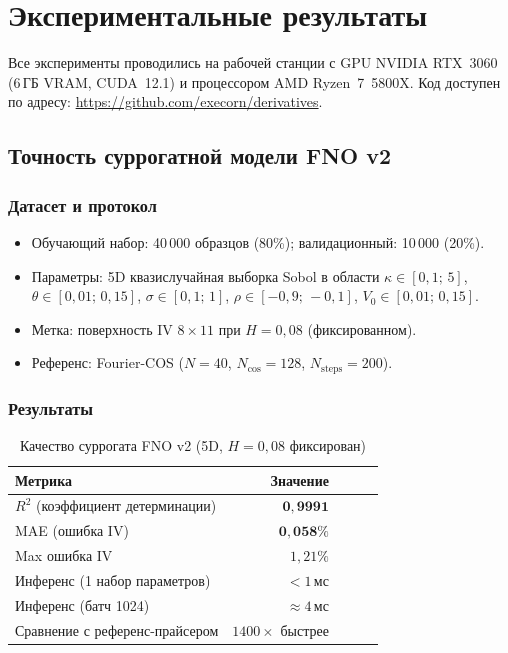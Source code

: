 
\section{Экспериментальные результаты}
\label{sec:experiments}

Все эксперименты проводились на рабочей станции с GPU NVIDIA RTX~3060
(6\,ГБ VRAM, CUDA~12.1) и процессором AMD Ryzen~7~5800X.
Код доступен по адресу: \url{https://github.com/execorn/derivatives}.

\subsection{Точность суррогатной модели FNO v2}
\label{sec:fno_accuracy}

\subsubsection{Датасет и протокол}

\begin{itemize}
  \item Обучающий набор: 40\,000 образцов (80\%); валидационный: 10\,000 (20\%).
  \item Параметры: 5D квазислучайная выборка Sobol в области
        $\kappa\in[0{,}1;\,5]$, $\theta\in[0{,}01;\,0{,}15]$,
        $\sigma\in[0{,}1;\,1]$, $\rho\in[-0{,}9;\,-0{,}1]$, $V_0\in[0{,}01;\,0{,}15]$.
  \item Метка: поверхность IV $8\times11$ при $H=0{,}08$ (фиксированном).
  \item Референс: Fourier-COS ($N=40$, $N_{\cos}=128$, $N_{\text{steps}}=200$).
\end{itemize}

\subsubsection{Результаты}

\begin{table}[H]
\centering
\caption{Качество суррогата FNO v2 (5D, $H=0{,}08$ фиксирован)}
\label{tab:fno_v2_results}
\begin{tabular}{l r r r r}
\toprule
Метрика & Значение \\
\midrule
$R^2$ (коэффициент детерминации) & $\mathbf{0{,}9991}$ \\
MAE (ошибка IV) & $\mathbf{0{,}058\%}$ \\
Max ошибка IV   & $1{,}21\%$ \\
Инференс (1 набор параметров) & $< 1\,\text{мс}$ \\
Инференс (батч 1024)          & $\approx 4\,\text{мс}$ \\
Сравнение с референс-прайсером & $1400\times$ быстрее \\
\bottomrule
\end{tabular}
\end{table}

